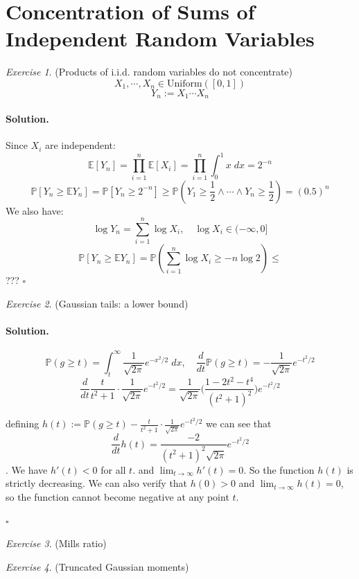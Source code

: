 \documentclass[11pt]{article}
\theoremstyle{definition}
\theoremstyle{remark}
\newtheorem{exercise}{Exercise}[section]
\newenvironment{solution}{\paragraph{Solution.}}{\hfill$\square$\medskip}
\newcommand{\E}{\mathbb{E}}
\newcommand{\Prob}{\mathbb{P}}
\newcommand{\1}{\mathbf{1}}
\begin{document}
\section{Concentration of Sums of Independent Random Variables}

\begin{exercise}
	(Products of i.i.d. random variables do not concentrate)
	\[X_1,\cdots,X_n \in \text{Uniform}([0,1])\]
	\[
	Y_n := X_1 \cdots X_n
	\]
\end{exercise}

\begin{solution}
	Since \(X_i\) are independent:
	\[
	\E[Y_n] = \prod_{i=1}^{n} \E[X_i] = \prod_{i=1}^{n} \int_{0}^{1} x\;dx = 2^{-n}
	\]
	\[
	\Prob[Y_n \geq \E Y_n] = \Prob[Y_n \geq 2^{-n}]  \geq \Prob(Y_1 \geq \frac12 \land \cdots \land Y_n \geq \frac{1}{2} ) = (0.5)^n
	\]
	We also have:
	\[
	\log Y_n = \sum_{i=1}^{n} \log X_i ,\quad \log X_i \in (-\infty, 0]
	\]
	\[
	\Prob[Y_n \geq \E Y_n] = \Prob(\sum_{i=1}^{n} \log X_i \geq -n \log 2) \leq 
	\]
	???
\end{solution}

\begin{exercise}
	(Gaussian tails: a lower bound)
\end{exercise}

\begin{solution}
	
	\[
	\Prob(g \geq t) = \int_{t}^{\infty} \frac{1}{\sqrt{2\pi}} e^{-x^2/2}\; dx
	, \quad \frac{d}{dt} \Prob(g \geq t) = - \frac{1}{\sqrt{2\pi}} e^{-t^2/2}
	\]
	\[
	 \frac{d}{dt}  \frac{t}{t^2 + 1} \cdot \frac{1}{\sqrt{2\pi}} e^{-t^2/2}
	= \frac{1}{\sqrt{2\pi}} \big( \frac{1 - 2t^2 - t^4}{(t^2 + 1)^2} \big)  e^{-t^2/2}
	\]
	
defining \(h(t) := \Prob(g \geq t) - \frac{t}{t^2 + 1} \cdot \frac{1}{\sqrt{2\pi}} e^{-t^2/2}\) we can see that 
\[
\frac{d}{dt} h(t) = \frac{-2}{ (t^2+1)^2 \sqrt{2\pi}} e^{-t^2/2}
\].
We have \(h'(t) < 0 \) for all \(t\). and \(\lim_{t\to \infty} h'(t) = 0\). So the function \(h(t)\) is strictly decreasing. We can also verify that \(h(0) > 0\) and \(\lim_{t \to \infty} h(t) = 0\), so the function cannot become negative at any point \(t\).
	
\end{solution}

\begin{exercise}
	(Mills ratio) 
\end{exercise}

\begin{exercise}
	(Truncated Gaussian moments)
\end{exercise}
\end{document}
